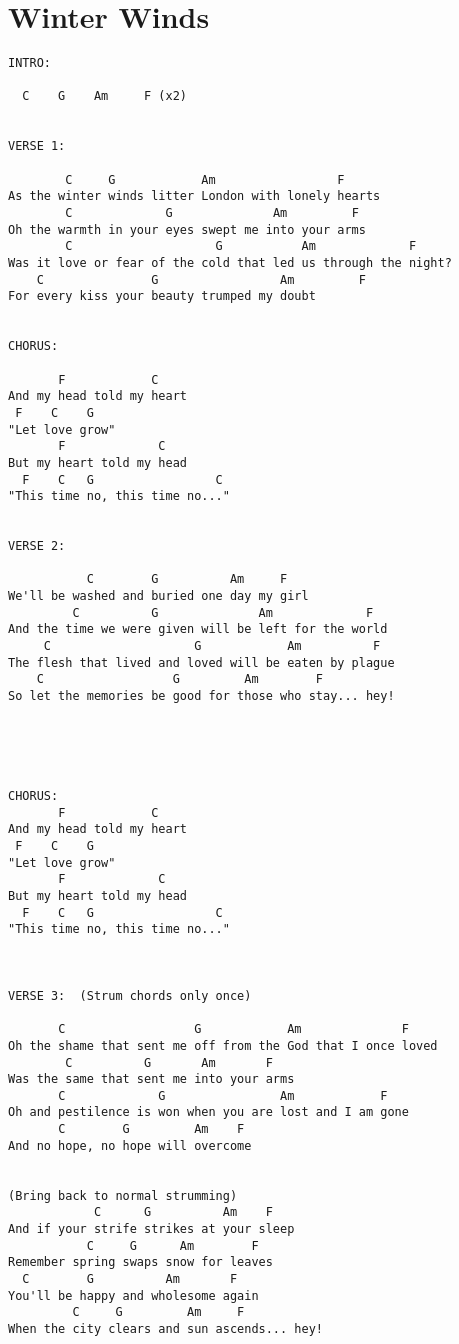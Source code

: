 \documentclass[leqno]{memoir}
\begin{document}
\chapter{Winter Winds}
\begin{verbatim}
INTRO:

  C    G    Am     F (x2)


VERSE 1:

        C     G            Am                 F
As the winter winds litter London with lonely hearts
        C             G              Am         F
Oh the warmth in your eyes swept me into your arms
        C                    G           Am             F
Was it love or fear of the cold that led us through the night?
    C               G                 Am         F
For every kiss your beauty trumped my doubt


CHORUS:

       F            C
And my head told my heart
 F    C    G  
"Let love grow"
       F             C
But my heart told my head
  F    C   G                 C
"This time no, this time no..."


VERSE 2:

           C        G          Am     F
We'll be washed and buried one day my girl
         C          G              Am             F
And the time we were given will be left for the world
     C                    G            Am          F
The flesh that lived and loved will be eaten by plague
    C                  G         Am        F
So let the memories be good for those who stay... hey!





CHORUS:
       F            C
And my head told my heart
 F    C    G  
"Let love grow"
       F             C
But my heart told my head
  F    C   G                 C
"This time no, this time no..."



VERSE 3:  (Strum chords only once)

       C                  G            Am              F
Oh the shame that sent me off from the God that I once loved
        C          G       Am       F
Was the same that sent me into your arms
       C             G                Am            F
Oh and pestilence is won when you are lost and I am gone
       C        G         Am    F
And no hope, no hope will overcome


(Bring back to normal strumming)
            C      G          Am    F
And if your strife strikes at your sleep
           C     G      Am        F
Remember spring swaps snow for leaves
  C        G          Am       F
You'll be happy and wholesome again
         C     G         Am     F
When the city clears and sun ascends... hey!


\end{verbatim}
\end{document}
